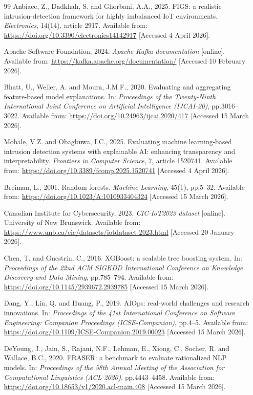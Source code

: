 \documentclass[12pt,a4paper]{report}
\begin{document}
\begin{thebibliography}{99}
Anbiaee, Z., Dadkhah, S. and Ghorbani, A.A., 2025. FIGS: a realistic intrusion-detection framework for highly imbalanced IoT environments. \textit{Electronics}, 14(14), article 2917. Available from: \url{https://doi.org/10.3390/electronics14142917} [Accessed 4 April 2026].

Apache Software Foundation, 2024. \textit{Apache Kafka documentation} [online]. Available from: \url{https://kafka.apache.org/documentation/} [Accessed 10 February 2026].

Bhatt, U., Weller, A. and Moura, J.M.F., 2020. Evaluating and aggregating feature-based model explanations. In: \textit{Proceedings of the Twenty-Ninth International Joint Conference on Artificial Intelligence (IJCAI-20)}, pp.3016--3022. Available from: \url{https://doi.org/10.24963/ijcai.2020/417} [Accessed 15 March 2026].

Mohale, V.Z. and Obagbuwa, I.C., 2025. Evaluating machine learning-based intrusion detection systems with explainable AI: enhancing transparency and interpretability. \textit{Frontiers in Computer Science}, 7, article 1520741. Available from: \url{https://doi.org/10.3389/fcomp.2025.1520741} [Accessed 4 April 2026].

Breiman, L., 2001. Random forests. \textit{Machine Learning}, 45(1), pp.5--32. Available from: \url{https://doi.org/10.1023/A:1010933404324} [Accessed 15 March 2026].

Canadian Institute for Cybersecurity, 2023. \textit{CIC-IoT2023 dataset} [online]. University of New Brunswick. Available from: \url{https://www.unb.ca/cic/datasets/iotdataset-2023.html} [Accessed 20 January 2026].

Chen, T. and Guestrin, C., 2016. XGBoost: a scalable tree boosting system. In: \textit{Proceedings of the 22nd ACM SIGKDD International Conference on Knowledge Discovery and Data Mining}, pp.785--794. Available from: \url{https://doi.org/10.1145/2939672.2939785} [Accessed 15 March 2026].

Dang, Y., Lin, Q. and Huang, P., 2019. AIOps: real-world challenges and research innovations. In: \textit{Proceedings of the 41st International Conference on Software Engineering: Companion Proceedings (ICSE-Companion)}, pp.4--5. Available from: \url{https://doi.org/10.1109/ICSE-Companion.2019.00023} [Accessed 15 March 2026].

DeYoung, J., Jain, S., Rajani, N.F., Lehman, E., Xiong, C., Socher, R. and Wallace, B.C., 2020. ERASER: a benchmark to evaluate rationalized NLP models. In: \textit{Proceedings of the 58th Annual Meeting of the Association for Computational Linguistics (ACL 2020)}, pp.4443--4458. Available from: \url{https://doi.org/10.18653/v1/2020.acl-main.408} [Accessed 15 March 2026].


\end{thebibliography}
\end{document}
